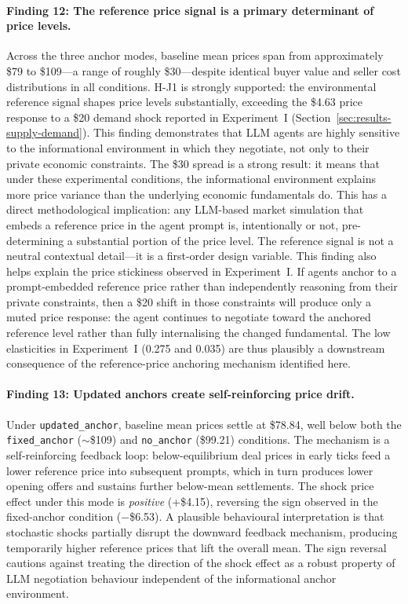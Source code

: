 \paragraph{Finding 12: The reference price signal is a primary determinant of price levels.}
Across the three anchor modes, baseline mean prices span from approximately \$79 to \$109---a range of roughly \$30---despite identical buyer value and seller cost distributions in all conditions.  H-J1 is strongly supported: the environmental reference signal shapes price levels substantially, exceeding the \$4.63 price response to a \$20 demand shock reported in Experiment~I (Section~\ref{sec:results-supply-demand}).  This finding demonstrates that LLM agents are highly sensitive to the informational environment in which they negotiate, not only to their private economic constraints.  The \$30 spread is a strong result: it means that under these experimental conditions, the informational environment explains more price variance than the underlying economic fundamentals do.  This has a direct methodological implication: any LLM-based market simulation that embeds a reference price in the agent prompt is, intentionally or not, pre-determining a substantial portion of the price level.  The reference signal is not a neutral contextual detail---it is a first-order design variable.  This finding also helps explain the price stickiness observed in Experiment~I.  If agents anchor to a prompt-embedded reference price rather than independently reasoning from their private constraints, then a \$20 shift in those constraints will produce only a muted price response: the agent continues to negotiate toward the anchored reference level rather than fully internalising the changed fundamental.  The low elasticities in Experiment~I (0.275 and 0.035) are thus plausibly a downstream consequence of the reference-price anchoring mechanism identified here.

\paragraph{Finding 13: Updated anchors create self-reinforcing price drift.}
Under \texttt{updated\_anchor}, baseline mean prices settle at \$78.84, well below both the \texttt{fixed\_anchor} ($\sim$\$109) and \texttt{no\_anchor} (\$99.21) conditions.  The mechanism is a self-reinforcing feedback loop: below-equilibrium deal prices in early ticks feed a lower reference price into subsequent prompts, which in turn produces lower opening offers and sustains further below-mean settlements.  The shock price effect under this mode is \emph{positive} (+\$4.15), reversing the sign observed in the fixed-anchor condition ($-$\$6.53).  A plausible behavioural interpretation is that stochastic shocks partially disrupt the downward feedback mechanism, producing temporarily higher reference prices that lift the overall mean.  The sign reversal cautions against treating the direction of the shock effect as a robust property of LLM negotiation behaviour independent of the informational anchor environment.

